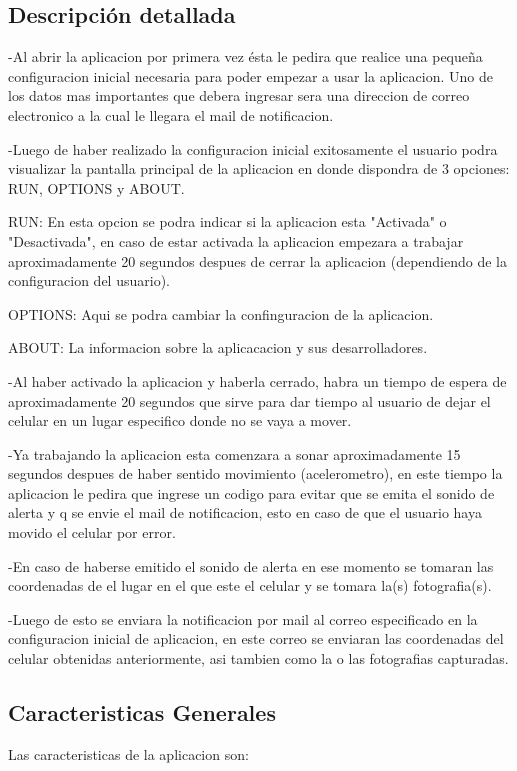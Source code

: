 \documentclass[12pt,letterpaper]{article}
\begin{document}
   
  \subsection{Descripción detallada}
  
  -Al abrir la aplicacion por primera vez ésta le pedira que realice una pequeña configuracion inicial necesaria para poder empezar a usar la aplicacion.
  Uno de los datos mas importantes que debera ingresar sera una direccion de correo electronico a la cual le llegara el mail de notificacion.
  
  -Luego de haber realizado la configuracion inicial exitosamente el usuario podra visualizar la pantalla principal de la aplicacion en donde dispondra de 3 opciones: RUN, OPTIONS y ABOUT.
  
  RUN: En esta opcion se podra indicar si la aplicacion esta "Activada" o "Desactivada", en caso de estar activada la aplicacion empezara a trabajar aproximadamente 20 segundos despues de cerrar la aplicacion (dependiendo de la configuracion del usuario).
  
  OPTIONS: Aqui se podra cambiar la confinguracion de la aplicacion.
  
  ABOUT: La informacion sobre la aplicacacion y sus desarrolladores.
  
  -Al haber activado la aplicacion y haberla cerrado, habra un tiempo de espera de aproximadamente 20 segundos que sirve para dar tiempo al usuario de dejar el celular en un lugar especifico donde no se vaya a mover.
  
  -Ya trabajando la aplicacion esta comenzara a sonar aproximadamente 15 segundos despues de haber sentido movimiento (acelerometro), en este tiempo la aplicacion le pedira que ingrese un codigo para evitar que se emita el sonido de alerta y q se envie el mail de notificacion, esto en caso de que el usuario haya movido el celular por error.
  
  -En caso de haberse emitido el sonido de alerta en ese momento se tomaran las coordenadas de el lugar en el que este el celular y se tomara la(s) fotografia(s).
  
  -Luego de esto se enviara la notificacion por mail al correo especificado en la configuracion inicial de aplicacion, en este correo se enviaran las coordenadas del celular obtenidas anteriormente, asi tambien como la o las fotografias capturadas.
  
  
  
   \subsection{Caracteristicas Generales}
   Las caracteristicas de la aplicacion son:
   
\end{document}
